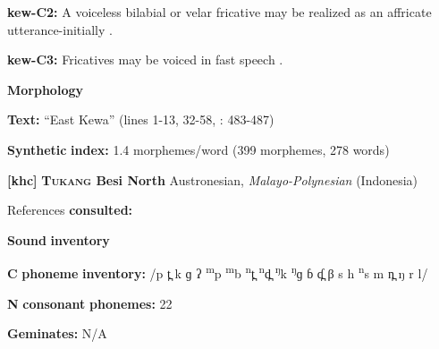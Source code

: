 \documentclass[output=paper]{langsci/langscibook}
\begin{document}
\begin{styleBody}
\textbf{kew-C2:} A voiceless bilabial or velar fricative may be realized as an affricate utterance-initially \citep[24]{Franklin1971}.
\end{styleBody}

\begin{styleBody}
\textbf{kew-C3:} Fricatives may be voiced in fast speech \citep[24]{Franklin1971}.
\end{styleBody}

\begin{styleBody}
\textbf{Morphology}
\end{styleBody}

\begin{styleBody}
\textbf{Text:} “East Kewa” (lines 1-13, 32-58, \citealt{FranklinFranklin1978}: 483-487)
\end{styleBody}

\begin{styleBody}
\textbf{Synthetic} \textbf{index:} 1.4 morphemes/word (399 morphemes, 278 words)
\end{styleBody}

\begin{styleBody}
\textbf{[khc]}   \textbf{\textsc{Tukang} \textbf{Besi} \textbf{North}}  Austronesian, \textit{Malayo-Polynesian} (Indonesia)
\end{styleBody}

\begin{styleBody}
References \textbf{consulted:} \citet{Donohue1999}
\end{styleBody}

\begin{styleBody}
\textbf{Sound} \textbf{inventory}
\end{styleBody}

\begin{styleBody}
\textbf{C} \textbf{phoneme} \textbf{inventory:} /p t̪ k ɡ ʔ \textsuperscript{m}p \textsuperscript{m}b \textsuperscript{n}t̪ \textsuperscript{n}d̪ \textsuperscript{ŋ}k \textsuperscript{ŋ}ɡ ɓ ɗ̪ β s h \textsuperscript{n}s m n̪ ŋ r l/
\end{styleBody}

\begin{styleBody}
\textbf{N} \textbf{consonant} \textbf{phonemes:} 22
\end{styleBody}

\begin{styleBody}
\textbf{Geminates:} N/A
\end{styleBody}
\end{document}
